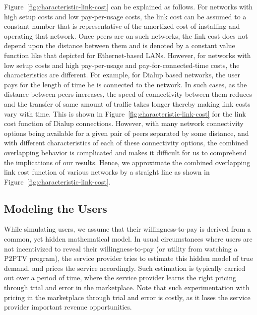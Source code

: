 \documentclass[conference,a4paper]{IEEEtran}
\begin{document}
Figure~\ref{fig:characteristic-link-cost} can be explained as follows. For networks with high setup costs and low pay-per-usage costs, the link cost can be assumed to a constant number that is representative of the amortized cost of installing and operating that network. Once peers are on such networks, the link cost does not depend upon the distance between them and is denoted by a constant value function like that depicted for Ethernet-based LANs. However, for networks with low setup costs and high pay-per-usage and pay-for-connected-time costs, the characteristics are different. For example, for Dialup based networks, the user pays for the length of time he is connected to the network. In such cases, as the distance between peers increases, the speed of connectivity between them reduces and the transfer of same amount of traffic takes longer thereby making link costs vary with time. This is shown in Figure~\ref{fig:characteristic-link-cost} for the link cost function of Dialup connections. However, with many network connectivity options being available for a given pair of peers separated by some distance, and with different characteristics of each of these connectivity options, the combined overlapping behavior is complicated and makes it difficult for us to comprehend the implications of our results. Hence, we approximate the combined overlapping link cost function of various networks by a straight line as shown in Figure~\ref{fig:characteristic-link-cost}.

\subsection{Modeling the Users}
\label{sec:modeling-users}
While simulating users, we assume that their willingness-to-pay is derived from a common, yet hidden mathematical model. In usual circumstances where users are not incentivized to reveal their willingness-to-pay (or utility from watching a P2PTV program), the service provider tries to estimate this hidden model of true demand, and prices the service accordingly. Such estimation is typically carried out over a period of time, where the service provider learns the right pricing through trial and error in the marketplace. Note that such experimentation with pricing in the marketplace through trial and error is costly, as it loses the service provider important revenue opportunities. 
\end{document}
